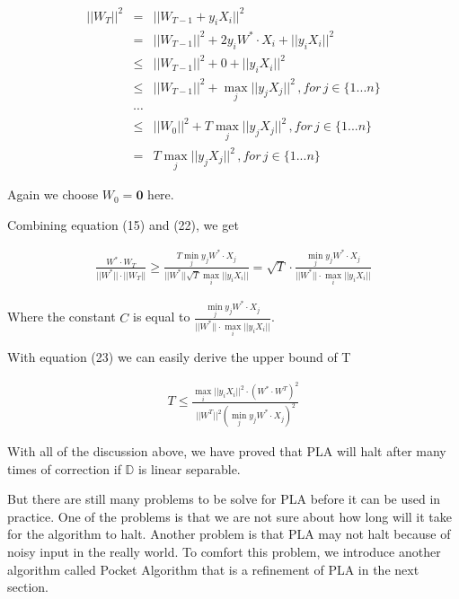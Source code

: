 \documentclass[11pt]{article}
\begin{document}
\begin{eqnarray}
||W_{T}||^2 &=& ||W_{T-1}+y_iX_i||^2\\
&=& ||W_{T-1}||^2 +2y_iW^* \cdot X_i + ||y_iX_i||^2\\
&\leq& ||W_{T-1}||^2 + 0 + ||y_iX_i||^2\\
&\leq& ||W_{T-1}||^2 + \max _j ||y_jX_j||^2 \, ,for \,j \in \{1...n\}\\
&\cdots&\\
&\leq& ||W_{0}||^2 + T \max _j ||y_jX_j||^2 \, ,for \,j \in \{1...n\}\\
&=& T \max _j ||y_jX_j||^2 \, ,for \,j \in \{1...n\}
\end{eqnarray}

Again we choose $W_0 = \textbf{0}$ here.

Combining equation (15) and (22), we get

\begin{eqnarray}
\frac{W^* \cdot W_{T}}{||W^*|| \cdot ||W_{T}||} \geq \frac{T \min \limits_j y_j W^* \cdot X_j}{||W^*|| \sqrt{T} \max \limits_i ||y_iX_i||} = \sqrt{T}\cdot \frac{\min \limits_j y_j W^* \cdot X_j}{||W^*|| \cdot \max \limits_i ||y_iX_i||}
\end{eqnarray}

Where the constant $C$ is equal to $\displaystyle{\frac{\min \limits_j y_j W^* \cdot X_j}{||W^*|| \cdot \max \limits_i ||y_iX_i||}}$.

With equation (23) we can easily derive the upper bound of T

\begin{eqnarray}
T \leq \frac{\max \limits_i ||y_iX_i||^2 \cdot \left( W^*\cdot W^T\right)^2}{||W^T||^2\left(\min \limits_j y_j W^* \cdot X_j\right)^2}
\end{eqnarray}

With all of the discussion above, we have proved that PLA will halt after many times of correction if $\mathbb{D}$ is linear separable.

But there are still many problems to be solve for PLA before it can be used in practice. One of the problems is that we are not sure about how long will it take for the algorithm to halt. Another problem is that PLA may not halt because of noisy input in the really world. To comfort this problem, we introduce another algorithm called Pocket Algorithm that is a refinement of PLA in the next section.
\end{document}
